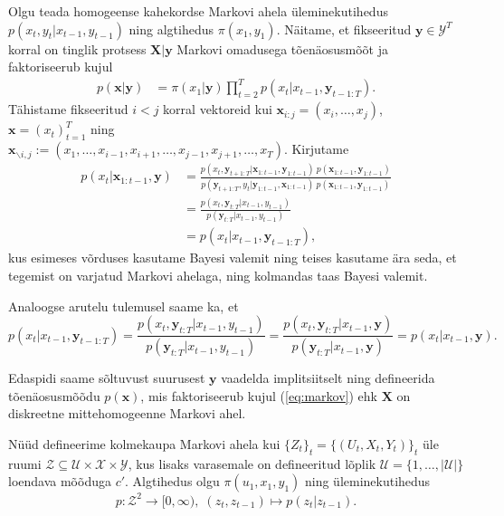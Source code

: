 Olgu teada homogeense kahekordse Markovi ahela üleminekutihedus $p(x_t, y_t | x_{t-1}, y_{t-1})$ ning algtihedus $\pi (x_1, y_1)$. Näitame, et fikseeritud $\bm{y}\in \mathcal{Y}^T$ korral on tinglik protsess $\bm{X}|\bm{y}$ Markovi omadusega tõenäosusmõõt ja faktoriseerub kujul
\begin{align}
    \label{eq:markov}
    p(\bm{x}|\bm{y}) &=  \pi (x_1|\bm{y}) \prod_{t=2}^T p(x_t | x_{t-1}, \bm{y}_{t-1:T}).
\end{align}
Tähistame fikseeritud $i < j$ korral vektoreid kui $\bm{x}_{i:j} = (x_i,\ldots,x_j)$, $\bm{x} = (x_t)_{t=1}^T$ ning \\
$\bm{x}_{\backslash i, j} := (x_1,\ldots,x_{i-1},x_{i+1},\ldots,x_{j-1},x_{j+1},\ldots,x_T)$. Kirjutame
\begin{align*}
    p(x_{t} | \bm{x}_{1:t-1}, \bm{y}) &= \frac{p(x_t, \bm{y}_{t+1:T} | \bm{x}_{1:t-1}, \bm{y}_{1:t-1}) \ p(\bm{x}_{1:t-1}, \bm{y}_{1:t-1})}{p(\bm{y}_{t+1:T}, y_t | \bm{y}_{1:t-1}, \bm{x}_{1:t-1}) \ p(\bm{x}_{1:t-1}, \bm{y}_{1:t-1})}\\
    &= \frac{p(x_t, \bm{y}_{t:T} | x_{t-1}, y_{t-1})}{p(\bm{y}_{t:T} | x_{t-1}, y_{t-1})} \\
    &= p(x_t | x_{t-1}, \bm{y}_{t-1:T}),
\end{align*}
kus esimeses võrduses kasutame Bayesi valemit ning teises kasutame ära seda, et tegemist on varjatud Markovi ahelaga, ning kolmandas taas Bayesi valemit.

Analoogse arutelu tulemusel saame ka, et
\begin{equation*}
    p(x_t | x_{t-1}, \bm{y}_{t-1:T}) = \frac{p(x_t, \bm{y}_{t:T} | x_{t-1}, y_{t-1})}{p(\bm{y}_{t:T} | x_{t-1}, y_{t-1})} = \frac{p(x_t, \bm{y}_{t:T} | x_{t-1}, \bm{y})}{p(\bm{y}_{t:T} | x_{t-1}, \bm{y})} = p(x_{t} | x_{t-1}, \bm{y}).
\end{equation*}

Edaspidi saame sõltuvust suurusest $\bm{y}$ vaadelda implitsiitselt ning defineerida tõenäosusmõõdu $p(\bm{x})$, mis faktoriseerub kujul (\ref{eq:markov}) ehk $\bm{X}$ on diskreetne mittehomogeenne Markovi ahel.

Nüüd defineerime kolmekaupa Markovi ahela kui $\{Z_t\}_{t} = \{(U_t,X_t,Y_t)\}_{t}$ üle ruumi $\mathcal{Z} \subseteq \mathcal{U} \times \mathcal{X} \times \mathcal{Y}$, kus lisaks varasemale on defineeritud lõplik $\mathcal{U} = \{1,\ldots,|\mathcal{U|}\}$ loendava mõõduga $c'$. Algtihedus olgu $\pi(u_1,x_1,y_1)$ ning üleminekutihedus 
$$p: \mathcal{Z}^2 \rightarrow [0,\infty),\; (z_t,z_{t-1}) \mapsto p(z_t|z_{t-1}).$$

